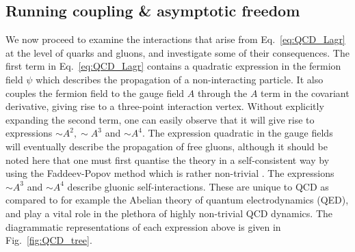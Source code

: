 \documentclass[11pt, a4paper, twoside]{book}
\begin{document}
\subsection{Running coupling \& asymptotic freedom}
\label{sec:QCD_run_free}
We now proceed to examine the interactions that arise from Eq.~\eqref{eq:QCD_Lagr} at the level of quarks and gluons, and investigate some of their consequences. The first term in Eq.~\eqref{eq:QCD_Lagr} contains a quadratic expression in the fermion field \(\psi\) which describes the propagation of a non-interacting particle. It also couples the fermion field to the gauge field \(A\) through the \(A\) term in the covariant derivative, giving rise to a three-point interaction vertex. Without explicitly expanding the second term, one can easily observe that it will give rise to expressions \(\sim\!A^2, \sim\!A^3\) and \(\sim\!A^4\). The expression quadratic in the gauge fields will eventually describe the propagation of free gluons, although it should be noted here that one must first quantise the theory in a self-consistent way by using the Faddeev-Popov method which is rather non-trivial \cite{Peskin:1995ev}. The expressions \(\sim\!A^3\) and \(\sim\!A^4\) describe gluonic self-interactions. These are unique to QCD as compared to for example the Abelian theory of quantum electrodynamics (QED), and play a vital role in the plethora of highly non-trivial QCD dynamics. The diagrammatic representations of each expression above is given in Fig.~\ref{fig:QCD_tree}. 
\end{document}
